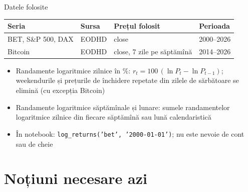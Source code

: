 \begin{frame}{Datele folosite}
\itemsize{\small}
\begin{center}
\footnotesize
\begin{tabular}{llll}
\toprule
\textbf{Seria} & \textbf{Sursa} & \textbf{Prețul folosit} & \textbf{Perioada} \\
\midrule
BET, S\&P 500, DAX & EODHD & close & 2000--2026 \\
Bitcoin & EODHD & close, 7 zile pe săptămînă & 2014--2026 \\
\bottomrule
\end{tabular}
\end{center}
\begin{itemize}
    \item Randamente logaritmice zilnice în \%: $r_t = 100\,(\ln P_t - \ln P_{t-1})$; weekendurile și prețurile de închidere repetate din zilele de sărbătoare se elimină (cu excepția Bitcoin)
    \item Randamente logaritmice săptămînale și lunare: sumele randamentelor logaritmice zilnice din fiecare săptămînă sau lună calendaristică
    \item În notebook: \texttt{log\_returns('bet', '2000-01-01')}; nu este nevoie de cont sau de cheie
\end{itemize}
\end{frame}


\section{Noțiuni necesare azi}

